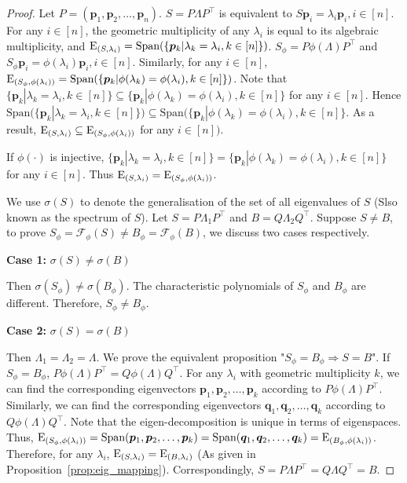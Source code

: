 \documentclass[nohyperref]{article}
\theoremstyle{plain}
\theoremstyle{definition}
\theoremstyle{remark}
\begin{document}
\begin{proof}
	
	Let $P=(\bm p_1, \bm p_2, \dots, \bm p_n)$.
	$S=P\Lambda P^{\top}$ is equivalent to $S\bm p_i=\lambda_i\bm p_i, i\in[n]$.
	For any $i\in[n]$, the geometric multiplicity of any $\lambda_i$ is equal to its algebraic multiplicity, and $\textrm E_{(S, \lambda_i)}=\textrm{Span}(\{\bm p_k|\lambda_k=\lambda_i, k\in[n]\})$.
	$S_{\phi}=P\phi(\Lambda)P^{\top}$ and $S_{\phi}\bm p_i=\phi(\lambda_i)\bm p_i, i\in[n]$.
	Similarly, for any $i\in[n]$, $\textrm E_{(S_{\phi}, \phi(\lambda_i))}=\textrm{Span}(\{\bm p_k|\phi(\lambda_k)=\phi(\lambda_i), k\in[n]\})$.
	Note that $\{\bm p_k|\lambda_k=\lambda_i, k\in[n]\}\subseteq\{\bm p_k|\phi(\lambda_k)=\phi(\lambda_i), k\in[n]\}$ for any $i\in[n]$.
	Hence $\textrm{Span}(\{\bm p_k|\lambda_k=\lambda_i, k\in[n]\})\subseteq\textrm{Span}(\{\bm p_k|\phi(\lambda_k)=\phi(\lambda_i), k\in[n]\}$.
	As a result, $\textrm E_{(S, \lambda_i)}\subseteq\textrm E_{(S_{\phi}, \phi(\lambda_i))}$ for any $i\in[n])$.
	
	If $\phi(\cdot)$ is injective, $\{\bm p_k|\lambda_k=\lambda_i, k\in[n]\}=\{\bm p_k|\phi(\lambda_k)=\phi(\lambda_i), k\in[n]\}$ for any $i\in[n]$.
	Thus $\textrm E_{(S, \lambda_i)}=\textrm E_{(S_{\phi}, \phi(\lambda_i))}$.
	
	We use $\sigma(S)$ to denote the generalisation of the set of all eigenvalues of $S$ (Slso known as the spectrum of $S$).
	Let $S=P\Lambda_1 P^{\top}$ and $B=Q\Lambda_2 Q^{\top}$.
	Suppose $S\neq B$,
	to prove $S_{\phi}=\mathcal F_{\phi}(S)\neq B_{\phi}=\mathcal F_{\phi}(B)$, we discuss two cases respectively.
	
	\textbf{Case 1:} $\sigma(S)\neq\sigma(B)$
	
	Then $\sigma(S_{\phi})\neq\sigma(B_{\phi})$.
	The characteristic polynomials of $S_{\phi}$ and $B_{\phi}$ are different.
	Therefore, $S_{\phi}\neq B_{\phi}$.
	
	\textbf{Case 2:} $\sigma(S)=\sigma(B)$
	
	Then $\Lambda_1=\Lambda_2=\Lambda$.
	We prove the equivalent proposition "$S_{\phi}=B_{\phi}\Rightarrow S=B$".
	If $S_{\phi}=B_{\phi}$, $P\phi(\Lambda)P^{\top}=Q\phi(\Lambda)Q^{\top}$.
	For any $\lambda_i$ with geometric multiplicity $k$, we can find the corresponding eigenvectors $\bm p_1, \bm p_2, \dots, \bm p_k$ according to $P\phi(\Lambda)P^{\top}$.
	Similarly, we can find the corresponding eigenvectors $\bm q_1, \bm q_2, \dots, \bm q_k$ according to $Q\phi(\Lambda)Q^{\top}$.
	Note that the eigen-decomposition is unique in terms of eigenspaces.
	Thus, $\textrm E_{(S_{\phi}, \phi(\lambda_i))}=\textrm{Span}(\bm p_1, \bm p_2, \dots, \bm p_k)=\textrm{Span}(\bm q_1, \bm q_2, \dots, \bm q_k)=\textrm E_{(B_{\phi}, \phi(\lambda_i))}$.
	Therefore, for any $\lambda_i$, $\textrm E_{(S, \lambda_i)}=\textrm E_{(B, \lambda_i)}$ (As given in Proposition~\ref{prop:eig_mapping}).
	Correspondingly, $S=P\Lambda P^{\top}=Q\Lambda Q^{\top}=B$.
	
\end{proof}
\end{document}
